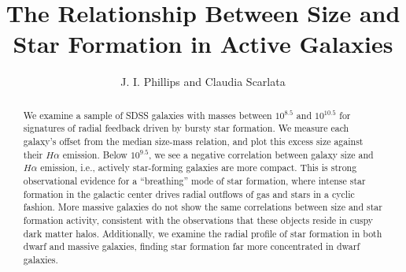 \documentclass[iop]{emulateapj}
\begin{document}

\title{The Relationship Between Size and Star Formation in Active Galaxies}


\author{J. I. Phillips and Claudia Scarlata }




\begin{abstract}
We examine a sample of SDSS galaxies with masses between $10^{8.5}$ and $10^{10.5}$ for signatures of radial feedback driven by bursty star formation. We measure each galaxy's offset from the median size-mass relation, and plot this excess size against their $H\alpha$ emission. Below $10^{9.5}$, we see a negative correlation between galaxy size and $H\alpha$ emission, i.e., actively star-forming galaxies are more compact. This is strong observational evidence for a ``breathing'' mode of star formation, where intense star formation in the galactic center drives radial outflows of gas and stars in a cyclic fashion. More massive galaxies do not show the same correlations between size and star formation activity, consistent with the observations that these objects reside in cuspy dark matter halos. Additionally, we examine the radial profile of star formation in both dwarf and massive galaxies, finding star formation far more concentrated in dwarf galaxies.
\end{abstract}
\end{document}
